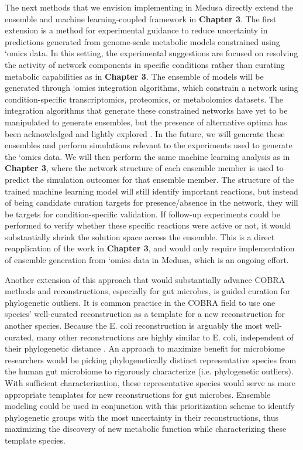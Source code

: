 \documentclass[11pt,onecolumn,notitlepage,openany,twoside]{book}
\begin{document}
\begin{refsection}
The next methods that we envision implementing in Medusa directly extend the ensemble and machine learning-coupled framework in \textbf{Chapter 3}. The first extension is a method for experimental guidance to reduce uncertainty in predictions generated from genome-scale metabolic models constrained using ‘omics data. In this setting, the experimental suggestions are focused on resolving the activity of network components in specific conditions rather than curating metabolic capabilities as in \textbf{Chapter 3}. The ensemble of models will be generated through ‘omics integration algorithms, which constrain a network using condition-specific transcriptomics, proteomics, or metabolomics datasets. The integration algorithms that generate these constrained networks have yet to be manipulated to generate ensembles, but the presence of alternative optima has been acknowledged and lightly explored \cite{Robaina-Estevez2017-fy}. In the future, we will generate these ensembles and perform simulations relevant to the experiments used to generate the ‘omics data. We will then perform the same machine learning analysis as in \textbf{Chapter 3}, where the network structure of each ensemble member is used to predict the simulation outcomes for that ensemble member. The structure of the trained machine learning model will still identify important reactions, but instead of being candidate curation targets for presence/absence in the network, they will be targets for condition-specific validation. If follow-up experiments could be performed to verify whether these specific reactions were active or not, it would substantially shrink the solution space across the ensemble. This is a direct reapplication of the work in \textbf{Chapter 3}, and would only require implementation of ensemble generation from ‘omics data in Medusa, which is an ongoing effort.

Another extension of this approach that would substantially advance COBRA methods and reconstructions, especially for gut microbes, is guided curation for phylogenetic outliers. It is common practice in the COBRA field to use one species’ well-curated reconstruction as a template for a new reconstruction for another species. Because the E. coli reconstruction is arguably the most well-curated, many other reconstructions are highly similar to E. coli, independent of their phylogenetic distance \cite{Monk2014-fa}. An approach to maximize benefit for microbiome researchers would be picking phylogenetically distinct representative species from the human gut microbiome to rigorously characterize (i.e. phylogenetic outliers). With sufficient characterization, these representative species would serve as more appropriate templates for new reconstructions for gut microbes. Ensemble modeling could be used in conjunction with this prioritization scheme to identify phylogenetic groups with the most uncertainty in their reconstructions, thus maximizing the discovery of new metabolic function while characterizing these template species.


\end{refsection}
\end{document}
